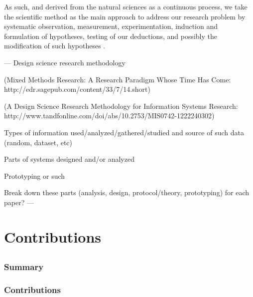 \documentclass[showtrims]{kthesis}
\begin{document}
As such, and derived from the natural sciences as a continuous process, we take 
the scientific method as the main approach to address our research problem by systematic 
observation, measurement, experimentation, induction and formulation of hypotheses, 
testing of our deductions, and possibly the modification of such hypotheses \cite{Oxford14}.

---
Design science research methodology

(Mixed Methods Research: A Research Paradigm Whose Time Has Come: http://edr.sagepub.com/content/33/7/14.short)

(A Design Science Research Methodology for Information Systems Research: http://www.tandfonline.com/doi/abs/10.2753/MIS0742-1222240302)

Types of information used/analyzed/gathered/studied and source of such data (random, dataset, etc)

Parts of systems designed and/or analyzed

Prototyping or such

Break down these parts (analysis, design, protocol/theory, prototyping) for each 
paper?
---

\chapter{Contributions}
\renewcommand\thesection{\Alph{section}}
\section{\ppPTP}
\begingroup\centering
\begin{ppBox}
\end{ppBox}
\endgroup

\subsection{Summary}
\subsection{Contributions}

\section{\ppEI}
\begingroup\centering
\begin{ppBox}
\end{ppBox}
\endgroup
\end{document}
